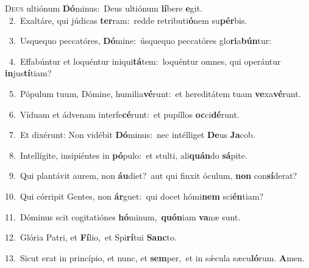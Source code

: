 \lettrine{\initial\textcolor{\initialcolor}{D}}{eus} ultiónum \textbf{Dó}\-minus:~\star Deus ultiónum \textbf{lí}\-bere \textbf{e}\-git.\\
{\numbfont\textcolor{\numbcolor}{~2.}}~Exaltáre, qui júdicas \textbf{ter}\-ram:~\star redde retributi\-\textbf{ó}\-nem su\-\textbf{pér}\-bis.\par
{\numbfont\textcolor{\numbcolor}{~3.}}~Usquequo peccatóres, \textbf{Dó}\-mine:~\star úsquequo peccatóres glo\-\textbf{ri}\-a\-\textbf{bún}\-tur:\par
{\numbfont\textcolor{\numbcolor}{~4.}}~Effabúntur et loquéntur iniqui\-\textbf{tá}\-tem:~\star loquéntur omnes, qui operántur \textbf{in}\-jus\-\textbf{tí}\-tiam?\par
{\numbfont\textcolor{\numbcolor}{~5.}}~Pópulum tuum, Dómine, humilia\-\textbf{vé}\-runt:~\star et hereditátem tuam \textbf{ve}\-xa\-\textbf{vé}\-runt.\par
{\numbfont\textcolor{\numbcolor}{~6.}}~Víduam et ádvenam interfe\-\textbf{cé}\-runt:~\star et pupíllos \textbf{oc}\-ci\-\textbf{dé}\-runt.\par
{\numbfont\textcolor{\numbcolor}{~7.}}~Et dixérunt: Non vidébit \textbf{Dó}\-minus:~\star nec intélliget \textbf{De}\-us \textbf{Ja}\-cob.\par
{\numbfont\textcolor{\numbcolor}{~8.}}~Intellígite, insipiéntes in \textbf{pó}\-pulo:~\star et stulti, ali\-\textbf{quán}\-do \textbf{sá}\-pite.\par
{\numbfont\textcolor{\numbcolor}{~9.}}~Qui plantávit aurem, non \textbf{áu}\-diet?~\star aut qui finxit óculum, \textbf{non} con\-\textbf{sí}\-derat?\par
{\numbfont\textcolor{\numbcolor}{10.}}~Qui córripit Gentes, non \textbf{ár}\-guet:~\star qui docet hómi\textbf{nem} sci\-\textbf{én}\-tiam?\par
{\numbfont\textcolor{\numbcolor}{11.}}~Dóminus scit cogitatiónes \textbf{hó}\-minum,~\star \textbf{quón}\-iam \textbf{va}\-næ sunt.\par
{\numbfont\textcolor{\numbcolor}{12.}}~Glória Patri, et \textbf{Fí}\-lio,~\star et Spi\-\textbf{rí}\-tui \textbf{Sanc}\-to.\par
{\numbfont\textcolor{\numbcolor}{13.}}~Sicut erat in princípio, et nunc, et \textbf{sem}\-per,~\star et in sǽcula sæcu\-\textbf{ló}\-rum. \textbf{A}\-men.\par
